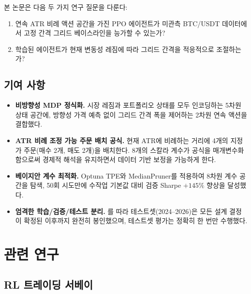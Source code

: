 \documentclass[11pt, a4paper]{article}
\begin{document}
본 논문은 다음 두 가지 연구 질문을 다룬다:

\begin{enumerate}[label=\textbf{RQ\arabic*:}]
    \item 연속 ATR 비례 액션 공간을 가진 PPO 에이전트가 미관측 BTC/USDT 데이터에서
          고정 간격 그리드 베이스라인을 능가할 수 있는가?
    \item 학습된 에이전트가 현재 변동성 레짐에 따라 그리드 간격을 적응적으로 조절하는가?
\end{enumerate}

\subsection*{기여 사항}

\begin{itemize}
    \item \textbf{비방향성 MDP 정식화.}
          시장 레짐과 포트폴리오 상태를 모두 인코딩하는 5차원 상태 공간에,
          방향성 가격 예측 없이 그리드 간격 폭을 제어하는 2차원 연속 액션을 결합했다.

    \item \textbf{ATR 비례 조정 가능 주문 배치 공식.}
          현재 ATR에 비례하는 거리에 4개의 지정가 주문(매수 2개, 매도 2개)을 배치한다.
          8개의 스칼라 계수가 공식을 매개변수화함으로써 경제적 해석을 유지하면서
          데이터 기반 보정을 가능하게 한다.

    \item \textbf{베이지안 계수 최적화.}
          Optuna TPE와 MedianPruner를 적용하여 8차원 계수 공간을 탐색,
          50회 시도만에 수작업 기본값 대비 검증 Sharpe $+145\%$ 향상을 달성했다.

    \item \textbf{엄격한 학습/검증/테스트 분리.}
          \citet{gort2022backtest}를 따라 테스트셋(2024--2026)은 모든 설계 결정이
          확정된 이후까지 완전히 봉인했으며, 테스트셋 평가는 정확히 한 번만 수행했다.
\end{itemize}

\section{관련 연구}

\subsection{RL 트레이딩 서베이}
\end{document}
